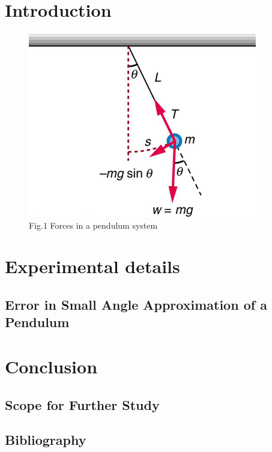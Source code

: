 \documentclass[12pt, twoside]{report}
\numberwithin{equation}{section}
\newcommand*\cleartoleftpage{%
  \clearpage
  \ifodd\value{page}\hbox{}\newpage\fi
}
\begin{document}
\chapter{Introduction}

\cleartoleftpage
\vspace*{6cm}
\begin{figure}[h]
  \begin{center}
    \includegraphics[width=10cm]{fig-1}
    \end{center}
  \caption*{Fig.1 Forces in a pendulum system}
 \end{figure}
\cleardoublepage
\chapter{Experimental details}
\section{Error in Small Angle Approximation of a Pendulum}

\cleardoublepage
\chapter{Conclusion}

\section{Scope for Further Study}

\section{Bibliography}

\end{document}
